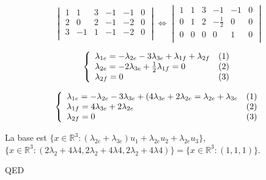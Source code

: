 \documentclass[]{book}
\theoremstyle{definition}
\newcommand{\bb}[1]{\mathbb{#1}}
\newcommand{\R}{\bb{R}}
\begin{document}
$$
\begin{vmatrix}
1 & 1  & 3 & -1 & -1 & 0\\
2 & 0  & 2 & -1 & -2 & 0\\
3 & -1 & 1 & -1 & -2 & 0\\
\end{vmatrix}
\Leftrightarrow
\begin{vmatrix}
1 & 1  & 3 & -1 & -1  & 0\\
0 & 1  & 2 & -\frac{1}{2} & 0 & 0\\
0 & 0 & 0 & 0 & 1 & 0\\
\end{vmatrix}
$$

$$
\left\{ 
\begin{array}{l l}
\lambda_{1e} = -\lambda_{2e} - 3\lambda_{3e} + \lambda_{1f} + \lambda_{2f} & (1)\\
\lambda_{2e} = -2\lambda_{3e} + \frac{1}{2}\lambda_{1f} = 0 & (2)\\
\lambda_{2f} = 0 & (3)\\
\end{array}
\right. 
$$ 

$$
\left\{ 
\begin{array}{l l}
\lambda_{1e} = -\lambda_{2e} - 3\lambda_{3e} + (4\lambda_{3e} + 2\lambda_{2e} = \lambda_{2e} + \lambda_{3e} & (1)\\
\lambda_{1f} = 4\lambda_{3e} + 2\lambda_{2e} & (2)\\
\lambda_{2f} = 0 & (3)\\
\end{array}
\right. 
$$ 


La base est $\{x \in \R^3: (\lambda_{2e} + \lambda_{3e})u_1 + \lambda_{2e}u_2 + \lambda_{2e}u_3 \}$, $\{x \in \R^3: (2\lambda_2 + 4\lambda4, 2\lambda_2 + 4\lambda4, 2\lambda_2 + 4\lambda4) \} = \{x \in \R^3: (1,1,1) \}$.

QED
\end{document}

